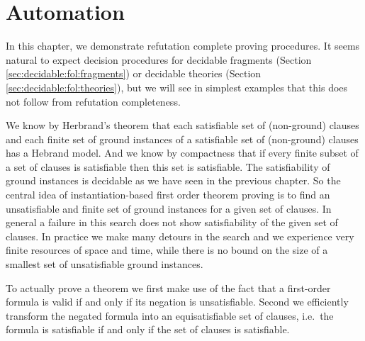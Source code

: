 
\chapter{Automation}



In this chapter, we demonstrate refutation complete proving procedures.
It seems natural to expect decision procedures for decidable fragments 
(Section \ref{sec:decidable:fol:fragments})
or decidable theories (Section \ref{sec:decidable:fol:theories}),
but we will see in simplest examples that this does not follow 
from refutation completeness.


%
We know by Herbrand's theorem 
that each satisfiable set of (non-ground) clauses
and each finite set of ground instances of a satisfiable set of (non-ground) clauses
has a Hebrand model. 
And we know by compactness 
that if every finite subset of a set of clauses is satisfiable then this set is satisfiable.
The satisfiability of ground instances is decidable as we have seen in the previous chapter.
So the central idea of instantiation-based first order theorem proving 
is to find an unsatisfiable and finite set of ground instances for a given set of clauses.
In general a failure in this search does not show satisfiability of the given set of clauses.
In practice we make many detours in the search and we experience very finite resources of space and time, 
while there is no bound on the size of a smallest set of unsatisfiable ground instances.



To actually prove a theorem 
we first make use of the fact that a first-order formula is valid if and only if its negation is unsatisfiable.
Second we efficiently transform the negated formula into an {\myem equisatisfiable} set of clauses,
i.e.~the formula is satisfiable if and only if the set of clauses is satisfiable.

